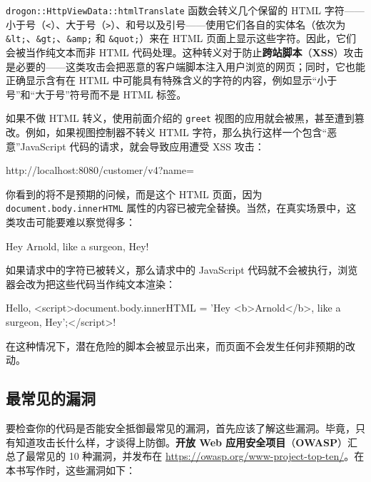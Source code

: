 \label{idx:1040}
\label{idx:1041}
\texttt{drogon::\allowbreak{}Http\allowbreak{}View\allowbreak{}Data::\allowbreak{}html\allowbreak{}Translate} 函数会转义几个保留的 HTML 字符——小于号（\texttt{<}）、大于号（\texttt{>}）、和号以及引号——使用它们各自的实体名（依次为 \texttt{\&lt;}、\texttt{\&gt;}、\texttt{\&amp;} 和 \texttt{\&quot;}）来在 HTML 页面上显示这些字符。因此，它们会被当作纯文本而非 HTML 代码处理。这种转义对于防止\textbf{跨站脚本}（\textbf{XSS}）攻击是必要的——这类攻击会把恶意的客户端脚本注入用户浏览的网页；同时，它也能正确显示含有在 HTML 中可能具有特殊含义的字符的内容，例如显示“小于号”和“大于号”符号而不是 HTML 标签。

如果不做 HTML 转义，使用前面介绍的 \texttt{greet} 视图的应用就会被黑，甚至遭到篡改。例如，如果视图控制器不转义 HTML 字符，那么执行这样一个包含“恶意”JavaScript 代码的请求，就会导致应用遭受 XSS 攻击：

\begin{codebox}[text]
http://localhost:8080/customer/v4?name=%
\end{codebox}

你看到的将不是预期的问候，而是这个 HTML 页面，因为 \texttt{document.\allowbreak{}body.\allowbreak{}inner\allowbreak{}HTML} 属性的内容已被完全替换。当然，在真实场景中，这类攻击可能要难以察觉得多：

\begin{codebox}[text]
Hey Arnold, like a surgeon, Hey!
\end{codebox}

如果请求中的字符已被转义，那么请求中的 JavaScript 代码就不会被执行，浏览器会改为把这些代码当作纯文本渲染：

\begin{codebox}[text]
Hello, <script>document.body.innerHTML = 'Hey <b>Arnold</b>, like a surgeon, Hey';</script>!
\end{codebox}

\label{idx:1042}
在这种情况下，潜在危险的脚本会被显示出来，而页面不会发生任何非预期的改动。

\subsection{最常见的漏洞}

\label{idx:1043}
\label{idx:1044}
要检查你的代码是否能安全抵御最常见的漏洞，首先应该了解这些漏洞。毕竟，只有知道攻击长什么样，才谈得上防御。\textbf{开放 Web 应用安全项目}（\textbf{OWASP}）汇总了最常见的 10 种漏洞，并发布在 \href{https://owasp.org/www-project-top-ten/}{https://owasp.org/www-project-top-ten/}。在本书写作时，这些漏洞如下：

